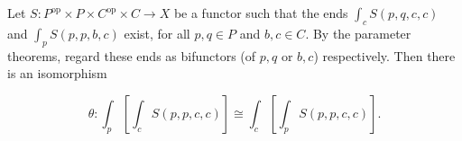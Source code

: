 Let $S: P^{\mathrm{op}} \times P \times C^{\mathrm{op}} \times C \to X$ be a functor such that the ends $\int_c S(p, q, c, c)$ and $\int_p S(p, p, b, c)$ exist, for all $p, q \in P$ and $b, c \in C$. By the parameter theorems, regard these ends as bifunctors (of $p, q$ or $b, c$) respectively. Then there is an isomorphism

$$\theta: \int_p \left[ \int_c S(p, p, c, c) \right] \cong \int_c \left[ \int_p S(p, p, c, c) \right].$$
